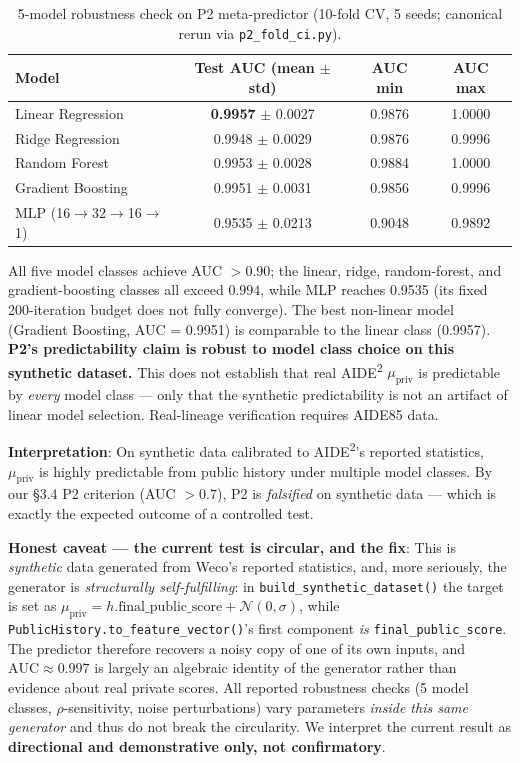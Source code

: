 \begin{table}[h]
\centering
\caption{5-model robustness check on P2 meta-predictor (10-fold CV, 5 seeds; canonical rerun via \texttt{p2\_fold\_ci.py}).}
\label{tab:p2-robust}
\begin{tabular}{lccc}
\toprule
Model & Test AUC (mean $\pm$ std) & AUC min & AUC max \\
\midrule
Linear Regression & \textbf{0.9957} $\pm$ 0.0027 & 0.9876 & 1.0000 \\
Ridge Regression & 0.9948 $\pm$ 0.0029 & 0.9876 & 0.9996 \\
Random Forest & 0.9953 $\pm$ 0.0028 & 0.9884 & 1.0000 \\
Gradient Boosting & 0.9951 $\pm$ 0.0031 & 0.9856 & 0.9996 \\
MLP (16$\to$32$\to$16$\to$1) & 0.9535 $\pm$ 0.0213 & 0.9048 & 0.9892 \\
\bottomrule
\end{tabular}
\end{table}

All five model classes achieve AUC $> 0.90$; the linear, ridge, random-forest, and gradient-boosting classes all exceed $0.994$, while MLP reaches 0.9535 (its fixed 200-iteration budget does not fully converge). The best non-linear model (Gradient Boosting, AUC = 0.9951) is comparable to the linear class (0.9957). \textbf{P2's predictability claim is robust to model class choice on this synthetic dataset.} This does not establish that real AIDE\textsuperscript{2} $\mu_{\text{priv}}$ is predictable by \emph{every} model class --- only that the synthetic predictability is not an artifact of linear model selection. Real-lineage verification requires AIDE85 data.

\textbf{Interpretation}: On synthetic data calibrated to AIDE\textsuperscript{2}'s reported statistics, $\mu_{\text{priv}}$ is highly predictable from public history under multiple model classes. By our \S3.4 P2 criterion (AUC $> 0.7$), P2 is \emph{falsified} on synthetic data --- which is exactly the expected outcome of a controlled test.

\textbf{Honest caveat — the current test is circular, and the fix}: This is \emph{synthetic} data generated from Weco's reported statistics, and, more seriously, the generator is \emph{structurally self-fulfilling}: in \texttt{build\_synthetic\_dataset()} the target is set as $\mu_{\text{priv}} = h.\text{final\_public\_score} + \mathcal{N}(0,\sigma)$, while \texttt{PublicHistory.to\_feature\_vector()}'s first component \emph{is} \texttt{final\_public\_score}. The predictor therefore recovers a noisy copy of one of its own inputs, and $\text{AUC}\approx0.997$ is largely an algebraic identity of the generator rather than evidence about real private scores. All reported robustness checks (5 model classes, $\rho$-sensitivity, noise perturbations) vary parameters \emph{inside this same generator} and thus do not break the circularity. We interpret the current result as \textbf{directional and demonstrative only, not confirmatory}.

